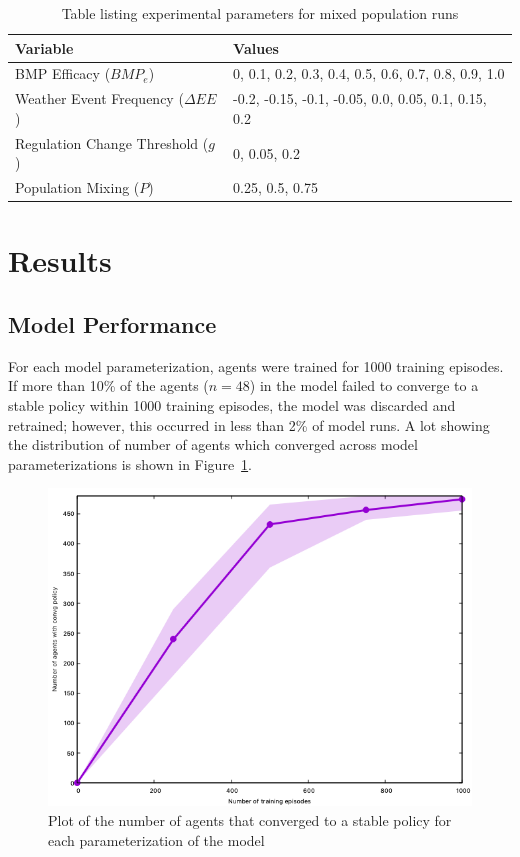 \begin{table}
\centering
\caption{Table listing experimental parameters for mixed population runs}
\label{tab:farm_ex_mix}
\begin{tabular}{ll}
\hline
Variable & Values \\
\hline
BMP Efficacy ($BMP_e$) & 0, 0.1, 0.2, 0.3, 0.4, 0.5, 0.6, 0.7, 0.8, 0.9, 1.0 \\
Weather Event Frequency ($\Delta EE$)
    & -0.2, -0.15, -0.1, -0.05, 0.0, 0.05, 0.1, 0.15, 0.2 \\
Regulation Change Threshold ($g$)
    & 0, 0.05, 0.2 \\
Population Mixing ($P$) & 0.25, 0.5, 0.75 \\
\hline
\end{tabular}
\end{table}

\section{Results}
\label{sec:farm_results}

\subsection{Model Performance}
\label{subsec:farm_results_robust}

For each model parameterization,
agents were trained for 1000 training episodes.
If more than 10\%  of the agents ($n=48$) in the model failed to converge
to a stable policy within 1000 training episodes, the model was discarded 
and retrained; however, this occurred in less than 2\% of model runs.
A lot showing the distribution of number of agents which converged
across model parameterizations is shown in Figure~\ref{fig:farm_sfc}.

\begin{figure}
\centering
\includegraphics[width=.4\textwidth]{figure/sfc}
\caption{Plot of the number of agents that converged to a stable policy
    for each parameterization of the model}
\label{fig:farm_sfc}
\end{figure}

